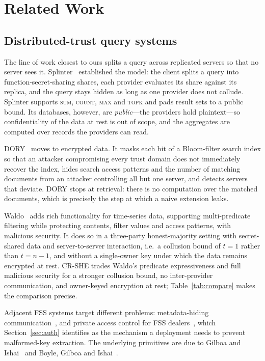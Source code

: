 \documentclass[journal]{IEEEtran}
\begin{document}
\section{Related Work}
\label{sec:related}

\subsection{Distributed-trust query systems}
The line of work closest to ours splits a query across replicated servers so that no server sees it. Splinter~\cite{splinter} established the model: the client splits a query into function-secret-sharing shares, each provider evaluates its share against its replica, and the query stays hidden as long as one provider does not collude. Splinter supports \textsc{sum}, \textsc{count}, \textsc{max} and \textsc{topk} and pads result sets to a public bound. Its databases, however, are \emph{public}---the providers hold plaintext---so confidentiality of the data at rest is out of scope, and the aggregates are computed over records the providers can read.

DORY~\cite{dory} moves to encrypted data. It masks each bit of a Bloom-filter search index so that an attacker compromising every trust domain does not immediately recover the index, hides search access patterns and the number of matching documents from an attacker controlling all but one server, and detects servers that deviate. DORY stops at retrieval: there is no computation over the matched documents, which is precisely the step at which a naive extension leaks.

Waldo~\cite{waldo} adds rich functionality for time-series data, supporting multi-predicate filtering while protecting contents, filter values and access patterns, with malicious security. It does so in a three-party honest-majority setting with secret-shared data and server-to-server interaction, i.e.\ a collusion bound of $t=1$ rather than $t=n-1$, and without a single-owner key under which the data remains encrypted at rest. CR-SHE trades Waldo's predicate expressiveness and full malicious security for a stronger collusion bound, no inter-provider communication, and owner-keyed encryption at rest; Table~\ref{tab:compare} makes the comparison precise.

Adjacent FSS systems target different problems: metadata-hiding communication~\cite{express}, and private access control for FSS dealers~\cite{pacl}, which Section~\ref{sec:auth} identifies as the mechanism a deployment needs to prevent malformed-key extraction. The underlying primitives are due to Gilboa and Ishai~\cite{gilboa2014distributed} and Boyle, Gilboa and Ishai~\cite{boyle2015function,boyle2016function}.
\end{document}
